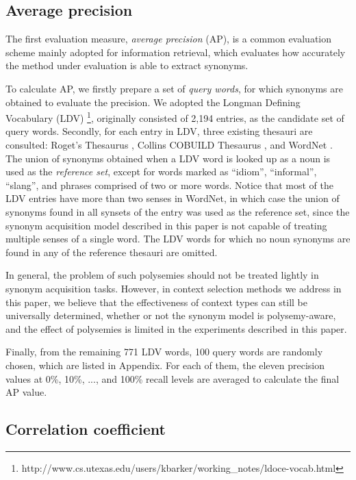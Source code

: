 \documentclass[english]{jnlp_1.4}
\begin{document}
\subsection{Average precision}

The first evaluation measure, {\em average precision} (AP), is a
common evaluation scheme mainly adopted for information retrieval,
which evaluates how accurately the method under evaluation is able to
extract synonyms.

To calculate AP, we firstly prepare a set of {\em query words}, for
which synonyms are obtained to evaluate the precision. We adopted the
Longman Defining Vocabulary (LDV)
\footnote{http://www.cs.utexas.edu/users/kbarker/working\_notes/ldoce-vocab.html},
originally consisted of 2,194 entries, as the candidate set of query
words. Secondly, for each entry in LDV, three existing thesauri are
consulted: Roget's Thesaurus \cite{Roget:95}, Collins COBUILD
Thesaurus \cite{Collins:02}, and WordNet \cite{Fellbaum:98}. The union
of synonyms obtained when a LDV word is looked up as a noun is used as
the {\em reference set}, except for words marked as ``idiom'', 
``informal'', ``slang'', and phrases comprised of two or more
words. Notice that most of the LDV entries have more than two senses
in WordNet, in which case the union of synonyms found in all synsets
of the entry was used as the reference set, since the synonym
acquisition model described in this paper is not capable of treating
multiple senses of a single word. The LDV words for which no noun
synonyms are found in any of the reference thesauri are omitted.


In general, the problem of such polysemies should not be treated
lightly in synonym acquisition tasks. However, in context selection
methods we address in this paper, we believe that the effectiveness of
context types can still be universally determined, whether or not the
synonym model is polysemy-aware, and the effect of polysemies is
limited in the experiments described in this paper.

Finally, from the remaining 771 LDV words, 100 query words are
randomly chosen, which are listed in Appendix. For each of them, the
eleven precision values at 0\%, 10\%, ..., and 100\% recall levels are
averaged to calculate the final AP value.

\subsection{Correlation coefficient}
\end{document}
